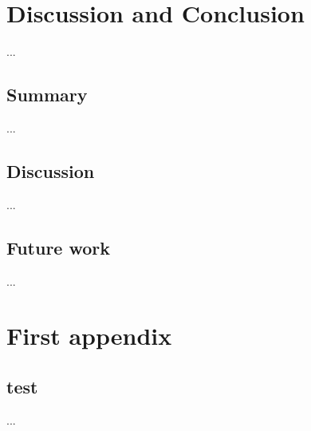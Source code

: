 \chapter{Discussion and Conclusion}\label{c.conclusion}
...

\section{Summary}\label{c.conclusion.summary}
...

\section{Discussion}\label{c.conclusion.discussion}
...

\section{Future work}\label{c.conclusion.future}
...

% 
% 
% 
% 
% 



\appendix
\chapter{First appendix}

\section{test}
...

